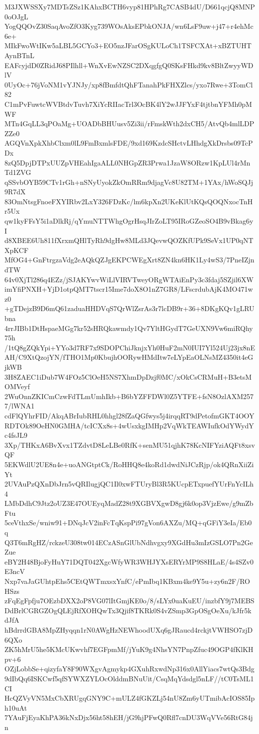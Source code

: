 M3JXWSSXy7MDTsZSz1KAhxBCTH6vyp81HPhRg7CASB4dU/D661qcjQ8MNP0oOJgL
YogQQOvZ30SaqAvoZfO3Kyg739WOsAksEPbkONJA/wn6LsF9uw+j47+r4ehMc6e+
MIkFwoWtIKw5aLBL5GCYo3+EO5nzJFarOSgKULoCh1TSFCXAt+xBZTUHTAynBTnL
EAFcyjdD0ZRidJ68PIlhll+WnXvEwNZSC2DXqgfgQ0SKsFHkd9kv8BltZwyyWDlV
0UyOc+76jVoNM1vYJNJy/xp8fBmfdtQhFTanahPkFHXZlcs/yxo7Rwe+3TomCl82
C1mPvFuwtcWVBtdvTuvh7XiYcRIIacTrl3OcBK4lY2wJJFYxF4tjtbnYFMh0pMWF
MTn4GqLL3qPOaMg+UOADbBHUusv5Zi3ii/rFmskWth2dxCH5/AtvQb4mlLDPZZe0
AGQVnXpkXhbClxm0lL9FmBxmlsFDE/9xd169KzdcSHctvLHhdgXkDrsbs09TcPDx
8zQ5DpjDTPxUUZpVHEahIgaALL0NHGpZR3Prwa1JzaW8ORzw1KpLUl4rMnTd1ZVG
qSSvbOYB59CTv1rGh+nSNyUyokZkOmRRm9djagVc8U82TM+1YAx/hWoSQJj9R7dX
83OmNtsgFnoeFXYIRbv2LxY326FDzKc/lm6kpXn2UKeKlUtKQsQOQNxocTnHr5Ux
qw1kyFFsY5i1aDlkRj/qYmuNTTWhgOgrHsqJIrZoLT95IRoGZeoSO4B9vBkag6yI
d8XBEE6Uh811fXrxmQHlTyRh9dgHw8MLd3JQevwQOZKfUPk9SeVx1UP0qNTXpKCF
MfOG4+GnFtrgzaVdg2eAQkQZJgEKPCWEgXrt8ZN4kn6HK1Ly4wS3/7PneIZjndTW
64v0XjTl286q4EZz/jSJAKYwvWiLlVIRVTweyORgWTAiEnPy3c3fdaj5SZjil6XW
imYfiPNXH+YjD1otpQMT7tscr15Ime7doX8O1nZ7GR8/LFscrdubAjK4MO471wz0
+gTDejzB9D6mQ61zaduaHHDVqS7QrWlZsrAs3r7lcDB9r+36+8DKgKQv1gLRUbna
4rrJIBb1DtHspaeMGg7kr52sHRQkawmdy1Qv7YltHGydT7GeUXN9Vw6miRQhy75h
/1tQ8gZQkYpi+YYo3d7RF7x9SDOPChiJknjxYh0HuF2mN0IUI7Yl524Uj23jx8nE
AH/C9XtQzojYN/fTHO1Mp0KbujhOORywHMdItw7eLYpEaOLNsMZ4350it4eGjkWB
3H8ZAEC1iDub7W4FOz5ClOeH5NS7XhmDpDzjf0MC/xOkCsCRMuH+B3etsMOMVeyf
2WuOnnZKICmCzwFdTLmUmhIkb+B6bYZFFDWl0Z5YTFE+fsN8OzlAXM2577/lWNA1
cdFlQYhrFID/AkqABrIubRHL0hhgl28fZaQGfwys5j4irqqRT9dPetofmGKT4OOY
RDTOk89OeHN0GMHA/tcICXx8s+4wUsxkgIMHp2VqWkTEAWIufkOdYWydYc4fsJL9
3Xp/THKxA6BvXvx1TZdvtD8LeLBe0RfK+senMU51qjhK78KcNIFYziAQFt8xsvQF
5EKWdlU2UE8n4e+uoANGtptCk/RoHHQ8e4koRd1dwdNiJCzRjp/ok4QRnXiiZiYt
2UVAuPzQXnDbJrn5vQRIlugjQC1Il0xwFTUryBl3R5KUcpETxpuefYUrFnYcILh4
LMbDdhC9Jtz2oUZ3E47OUEyqMadZ28t9XGBVXgwD8gj6k0op3VjzEwe/g9mZbFtu
5ceVthxSe/wniw91+DNqJcV2inFcTqKspPi97gVon6AXZu/MQ+qGFiY3eIa/Eb0q
Q3T6mRgHZ/rckzeU308tw014ECzASnGlUbNdhvgxy9XGdHu3mIzGSLO7Pn2GeZue
eBY2H48BjoFyHuY71DQT042XgcWfyWR3WHJYXsERYrMP9S8HLaE/4s4SZv0E3ncV
Nxp7vaJaGUhtpEhs5CEtQWTmxsxYnfC/ePmIbq1KBxm4ke9Y5u+zy6n2F/ROHSzs
zFqEgFpfju7OEzbDXX2oP8VG07lItGmjKE0o/8/sLYx0uaKuEU/inzbfY9j7MEBS
DdBrlCGRGZOgQLEjRfXOHQwTx3Qjif8TKRk0S4vZSmp3GpOSgOeXu/kJfr5kdJfA
hBdrrdGBA8MpZHyqqn1rN0AWgHzNEWhoodUXq6gJRaucd4rckjtVWHSO7zjD6QXo
ZK5hMrU5he5KMcUKwvhf7EGFpmMf/jYuK9g4NhsYN7PnpZfuc49OGP4fKlKHpv+6
OZjLobbSe+qizyfaY8F90WXgvAgmykp4GXuhRxwdNp316x0AllYiacs7wtQs3Bdg
9dIbQq6ISKCwf5qfSYWXZYLOcOlddmBNuUit/CsqMqYdsdgl5nLF//tC0TsML1CI
HcQZVyVN5MxCbXRUgqGNY9C+mULZ4fGKZLj54nU8Zm6yUTmibAcIOS85Iph10uAt
7YAuFjEyaKhPA36kNxDjx56ht58hEH/jG9hjPFwQ0Rfl7cnDU3WqVVe56RtG84jn
